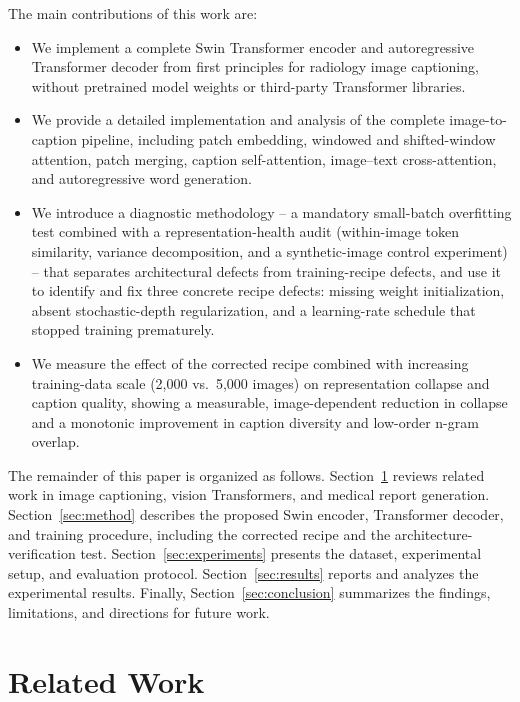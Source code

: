 \documentclass[conference]{IEEEtran}
\begin{document}
The main contributions of this work are:
\begin{itemize}
    \item We implement a complete Swin Transformer encoder and autoregressive Transformer decoder from first principles for radiology image captioning, without pretrained model weights or third-party Transformer libraries.

    \item We provide a detailed implementation and analysis of the complete image-to-caption pipeline, including patch embedding, windowed and shifted-window attention, patch merging, caption self-attention, image--text cross-attention, and autoregressive word generation.

    \item We introduce a diagnostic methodology -- a mandatory small-batch overfitting test combined with a representation-health audit (within-image token similarity, variance decomposition, and a synthetic-image control experiment) -- that separates architectural defects from training-recipe defects, and use it to identify and fix three concrete recipe defects: missing weight initialization, absent stochastic-depth regularization, and a learning-rate schedule that stopped training prematurely.

    \item We measure the effect of the corrected recipe combined with increasing training-data scale (2,000 vs.\ 5,000 images) on representation collapse and caption quality, showing a measurable, image-dependent reduction in collapse and a monotonic improvement in caption diversity and low-order n-gram overlap.
\end{itemize}

The remainder of this paper is organized as follows. Section~\ref{sec:related} reviews related work in image captioning, vision Transformers, and medical report generation. Section~\ref{sec:method} describes the proposed Swin encoder, Transformer decoder, and training procedure, including the corrected recipe and the architecture-verification test. Section~\ref{sec:experiments} presents the dataset, experimental setup, and evaluation protocol. Section~\ref{sec:results} reports and analyzes the experimental results. Finally, Section~\ref{sec:conclusion} summarizes the findings, limitations, and directions for future work.

\section{Related Work}
\label{sec:related}
\end{document}
